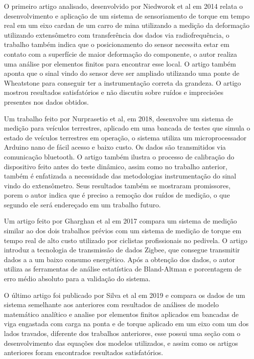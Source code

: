 O primeiro artigo analisado, desenvolvido por Niedworok et al em 2014 relata o desenvolvimento e aplicação de um sistema de sensoriamento de torque em tempo real em um eixo cardan de um carro de mina utilizando a medição da deformação utilizando extensômetro com transferência dos dados via radiofrequência, o trabalho também indica que o posicionamento do sensor necessita estar em contato com a superfície de maior deformação do componente, o autor realiza uma análise por elementos finitos para encontrar esse local. O artigo também aponta que o sinal vindo do sensor deve ser ampliado utilizando uma ponte de Wheatstone para conseguir ter a instrumentação correta da grandeza. O artigo mostrou resultados satisfatórios e não discutiu sobre ruídos e imprecisões presentes nos dados obtidos.

Um trabalho feito por Nurprasetio et al, em 2018, desenvolve um sistema de medição para veículos terrestres, aplicado em uma bancada de testes que simula o estado de veículos terrestres em operação, o sistema utiliza um microprocessador Arduino nano de fácil acesso e baixo custo. Os dados são transmitidos via comunicação bluetooth. O artigo também ilustra o processo de calibração do dispositivo feito antes do teste dinâmico, assim como no trabalho anterior, também é enfatizada a necessidade das metodologias instrumentação do sinal vindo do extensômetro. Seus resultados também se mostraram promissores, porem o autor indica que
é preciso a remoção dos ruídos de medição, o que segundo ele será endereçado em um trabalho futuro.

Um artigo feito por Gharghan et al em 2017 compara um sistema de medição similar ao dos dois trabalhos prévios com um sistema de medição de torque em tempo real de alto custo utilizado por ciclistas profissionais no pedivela. O artigo introduz a tecnologia de transmissão de dados Zigbee, que consegue transmitir dados a a um baixo consumo energético. Após a obtenção dos dados, o autor utiliza as ferramentas de análise estatística de Bland-Altman e porcentagem de erro médio absoluto para a validação do sistema.

O último artigo foi publicado por Silva et al em 2019 e compara os dados de um sistema semelhante aos anteriores com resultados de análises de modelo matemático analítico e analise por elementos finitos aplicados em bancadas de viga engastada com carga na ponta e de torque aplicado em um eixo com um dos lados travados, diferente dos trabalhos anteriores, esse possui uma seção com o desenvolvimento das equações dos modelos utilizados, e assim como os artigos anteriores foram encontrados resultados satisfatórios.

